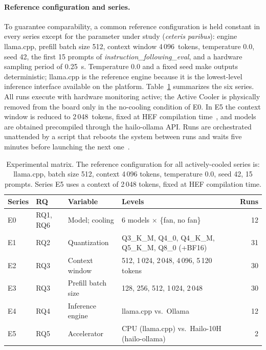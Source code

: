 \documentclass[acmsmall,natbib=false]{acmart}
\begin{document}
\paragraph{Reference configuration and series.}
To guarantee comparability, a common reference configuration is held constant
in every series except for the parameter under study (\emph{ceteris
paribus}): engine llama.cpp, prefill batch size 512, context window
4\,096~tokens, temperature 0.0, seed 42, the first 15 prompts of
\textit{instruction\_following\_eval}, and a hardware sampling period of
0.25~s. Temperature 0.0 and a fixed seed make outputs deterministic;
llama.cpp is the reference engine because it is the lowest-level inference
interface available on the platform. Table~\ref{tab:matrix} summarizes the
six series. All runs execute with hardware monitoring active; the Active
Cooler is physically removed from the board only in the no-cooling
condition of E0. In E5 the
context window is reduced to 2\,048~tokens, fixed at HEF compilation
time~\cite{HailoDeepSeekR1Qwen15B}, and models are obtained precompiled
through the hailo-ollama API. Runs are orchestrated unattended by a script
that reboots the system between runs and waits five minutes before launching
the next one~\cite{carrascosa_carro_tfg-yisusccscripts_2026}.

\begin{table}[t]
\centering
\caption{Experimental matrix. The reference configuration for all
actively-cooled series is: llama.cpp, batch size 512, context 4\,096 tokens,
temperature 0.0, seed 42, 15 prompts. Series E5 uses a context of 2\,048
tokens, fixed at HEF compilation time.}
\label{tab:matrix}
\small
\setlength{\tabcolsep}{5pt}
\begin{tabular}{l l l l r}
\toprule
\textbf{Series} & \textbf{RQ} & \textbf{Variable} & \textbf{Levels} &
\textbf{Runs} \\
\midrule
E0 & RQ1, RQ6 & Model; cooling & 6 models $\times$ \{fan, no fan\} & 12 \\
E1 & RQ2 & Quantization & Q3\_K\_M, Q4\_0, Q4\_K\_M, Q5\_K\_M, Q8\_0 (+BF16) & 31 \\
E2 & RQ3 & Context window & 512, 1\,024, 2\,048, 4\,096, 5\,120 tokens & 30 \\
E3 & RQ3 & Prefill batch size & 128, 256, 512, 1\,024, 2\,048 & 30 \\
E4 & RQ4 & Inference engine & llama.cpp vs.\ Ollama & 12 \\
E5 & RQ5 & Accelerator & CPU (llama.cpp) vs.\ Hailo-10H (hailo-ollama) & 2 \\
\bottomrule
\end{tabular}
\end{table}
\end{document}

